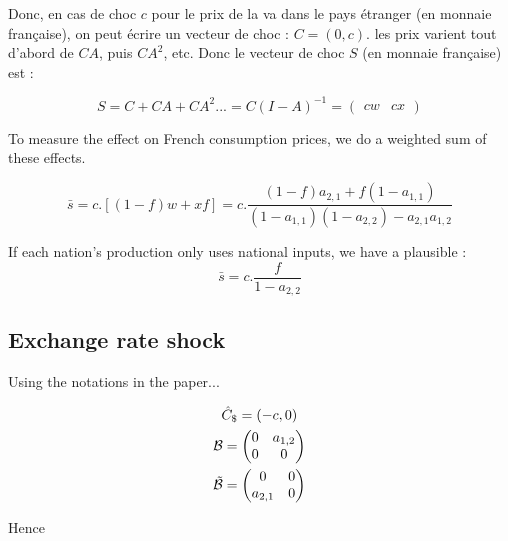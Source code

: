 \documentclass[11pt,a4paper]{article}
\begin{document}
Donc, en cas de choc $c$ pour le prix de la va dans le pays étranger (en monnaie française), on peut écrire un vecteur de choc : $C=\left(0,c\right)$.  les prix varient tout d'abord de  $CA$, puis $CA^2$, etc. Donc le vecteur de choc $S$ (en monnaie française) est : 


\begin{equation*}
S=C+CA+CA^2...=C(I-A)^{-1}=\left(\begin{matrix}cw  &   cx\end{matrix}\right)
\end{equation*}

To measure the effect on French consumption prices, we do a weighted sum of these effects.

\begin{equation}
\bar{s}=c.\left[\left(1-f\right)w+xf\right]=c.\frac{\left(1-f\right)a_{2,1}+f\left(1-a_{1,1}\right)}{\left(1-a_{1,1}\right)\left(1-a_{2,2}\right)-a_{2,1}a_{1,2}}
\end{equation}

If each nation's production only uses national inputs, we have a plausible :
\begin{equation*}
\bar{s}=c.\frac{f}{1-a_{2,2}}
\end{equation*}

\subsection{Exchange rate shock}

Using the notations in the paper...

\begin{gather*}
\hat{C}_\$=\left(-c,0\right)
\\
\cal B = \left(\begin{matrix}0&a_{1,2}\\0&0\end{matrix}\right)
\\
\tilde{\cal B} = \left(\begin{matrix}0&0\\a_{2,1}&0\end{matrix}\right)
\end{gather*}

Hence
\end{document}
